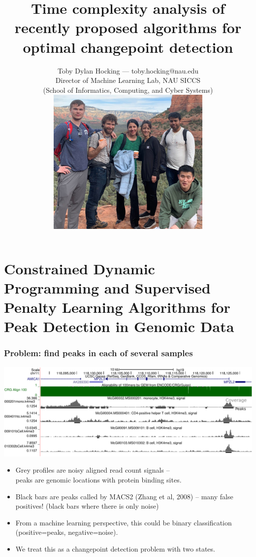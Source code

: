 \documentclass[t]{beamer}
\begin{document}
\title{Time complexity analysis of recently proposed algorithms for
  optimal changepoint detection}

\author{Toby Dylan Hocking --- toby.hocking@nau.edu\\
Director of Machine Learning Lab, NAU SICCS\\
(School of Informatics, Computing, and Cyber Systems)\\
\includegraphics[width=0.6\textwidth]{2019-12-ml-lab-sedona-cropped-lores.jpeg}
}


\maketitle

\section{Constrained Dynamic Programming and Supervised Penalty
  Learning Algorithms for Peak Detection in Genomic Data}

\begin{frame}
  \frametitle{Problem: find peaks in each of several samples}
  \includegraphics[width=\textwidth]{screenshot-ucsc-edited}

  \begin{itemize}
  \item Grey profiles are noisy aligned read count signals -- \\peaks
    are genomic locations with protein binding sites.
  \item Black bars are peaks called by MACS2 (Zhang et al, 2008) -- many
    false positives! (black bars where there is only noise)
  \item From a machine learning perspective, this could be binary
    classification (positive=peaks, negative=noise).
  \item We treat this as a changepoint detection problem with two
    states.
  \end{itemize}
\end{frame}
\end{document}
